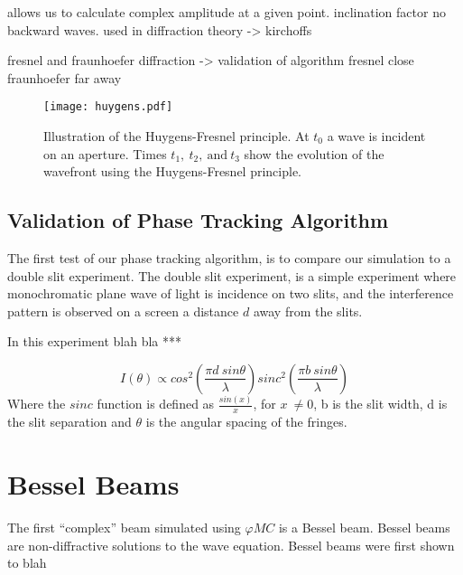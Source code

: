 allows us to calculate complex amplitude at a given point. 
inclination factor no backward waves.
used in diffraction theory -> kirchoffs

fresnel and fraunhoefer diffraction -> validation of algorithm
fresnel close
fraunhoefer far away

\begin{figure}[!ht]
    \centering
    \texttt{[image: huygens.pdf]}
    \caption{Illustration of the Huygens-Fresnel principle. At $t_0$ a wave is incident on an aperture. Times $t_1,\ t_2,\ \text{and}\ t_3$ show the evolution of the wavefront using the Huygens-Fresnel principle.}
    \label{fig:huygensillis}
\end{figure}

\subsection{Validation of Phase Tracking Algorithm}

The first test of our phase tracking algorithm, is to compare our simulation to a double slit experiment.
The double slit experiment, is a simple experiment where monochromatic plane wave of light is incidence on two slits, and the interference pattern is observed on a screen a distance $d$ away from the slits.

In this experiment blah bla ***

\begin{equation}
    I(\theta) \propto cos^2\left(\frac{\pi d\ sin \theta}{\lambda}\right)sinc^2\left(\frac{\pi b\ sin\theta}{\lambda}\right)
\end{equation}
Where the $sinc$ function is defined as $\tfrac{sin(x)}{x}$, for $x\ \neq 0$, b is the slit width, d is the slit separation and $\theta$ is the angular spacing of the fringes.

\section{Bessel Beams}

The first ``complex'' beam simulated using $\varphi MC$ is a Bessel beam. 
Bessel beams are non-diffractive solutions to the wave equation. 
Bessel beams were first shown to blah




